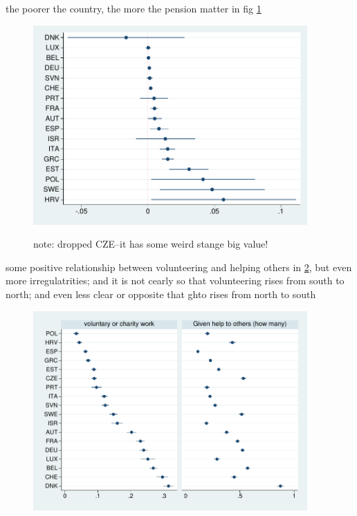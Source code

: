 \documentclass[10pt, letterpaper]{article}
\begin{document}
\begin{spacing}{1.4}



the poorer the country, the more the pension matter in fig \ref{pen-means}

\begin{figure}[H]
 \includegraphics[height=3in]{tmp/pen-means.pdf}\centering\label{pen-means}
\caption{note: dropped CZE--it has some weird stange big value!}
\end{figure}

some positive relationship between volunteering and helping others in
\ref{volCha-ghto-means}, but even more irregulatrities; and it is not cearly so
that volunteering rises from south to north; and even less clear or opposite
that ghto rises from north to south

\begin{figure}[H]
 \includegraphics[height=3in]{tmp/volCha-ghto-means.pdf}\centering\label{volCha-ghto-means}
\caption{}
\end{figure}



\end{spacing}
\end{document}
